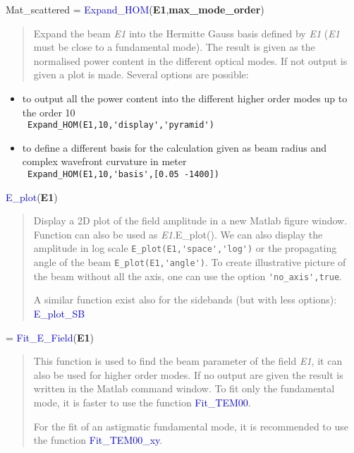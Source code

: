 \noindent Mat\_scattered = \textcolor{blue}{Expand\_HOM}(\textbf{E1},\textbf{max\_mode\_order})
\vspace*{-0.2cm}
\begin{quote}
Expand the beam \textsl{E1} into the Hermitte Gauss basis defined by \textsl{E1} (\textsl{E1} must be close to a fundamental mode). The result is given as the normalised power content in the different optical modes. If not output is given a plot is made. Several options are possible:
\end{quote}
\begin{itemize}
  \item to output all the power content into the different higher order modes up to the order 10 \\
        \verb? Expand_HOM(E1,10,'display','pyramid') ?
  \item to define a different basis for the calculation given as beam radius and complex wavefront curvature in meter\\
        \verb? Expand_HOM(E1,10,'basis',[0.05 -1400]) ?
\end{itemize}


\noindent \textcolor{blue}{E\_plot}(\textbf{E1})
\vspace*{-0.2cm}
\begin{quote}
Display a 2D plot of the field amplitude in a new Matlab figure window. Function can also be used as \textsl{E1}.E\_plot(). We can also display the amplitude in log scale \verb?E_plot(E1,'space','log')? or the propagating angle of the beam \verb?E_plot(E1,'angle')?. To create illustrative picture of the beam without all the axis, one can use the option \verb?'no_axis',true?.

A similar function exist also for the sidebands (but with less options): \noindent \textcolor{blue}{E\_plot\_SB}
\end{quote}


 = \textcolor{blue}{Fit\_E\_Field}(\textbf{E1})
\vspace*{-0.2cm}
\begin{quote}
This function is used to find the beam parameter of the field \textsl{E1}, it can also be used for higher order modes. If no output are given the result is written in the Matlab command window. To fit only the fundamental mode, it is faster to use the function \textcolor{blue}{Fit\_TEM00}.

For the fit of an astigmatic fundamental mode, it is recommended to use the function \textcolor{blue}{Fit\_TEM00\_xy}.
\end{quote}


